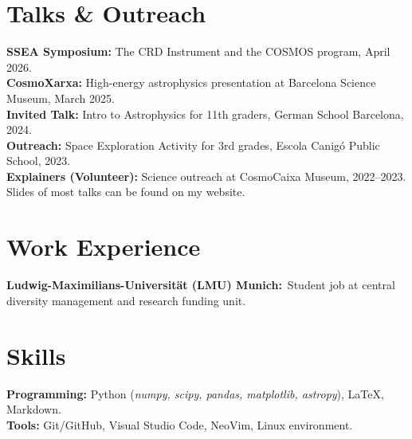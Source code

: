 \documentclass[11pt,a4paper]{article}
\begin{document}
\section*{Talks \& Outreach}
\textbf{SSEA Symposium:} The CRD Instrument and the COSMOS program, April 2026. \\
\textbf{CosmoXarxa:} High-energy astrophysics presentation at Barcelona Science Museum, March 2025. \\
\textbf{Invited Talk:} Intro to Astrophysics for 11th graders, German School Barcelona, 2024. \\
\textbf{Outreach:} Space Exploration Activity for 3rd grades, Escola Canigó Public School, 2023. \\
\textbf{Explainers (Volunteer):} Science outreach at CosmoCaixa Museum, 2022--2023. \\
Slides of most talks can be found on my website.

\section*{Work Experience}
\textbf{Ludwig-Maximilians-Universität (LMU) Munich:} Student job at central diversity management and research funding unit.

\section*{Skills}
\textbf{Programming:} Python (\textit{numpy, scipy, pandas, matplotlib, astropy}), LaTeX, Markdown. \\
\textbf{Tools:} Git/GitHub, Visual Studio Code, NeoVim, Linux environment.
\end{document}
